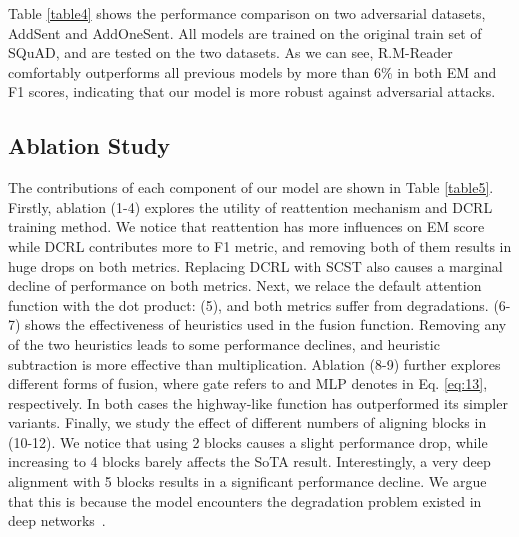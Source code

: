 \documentclass{article}
\begin{document}
Table \ref{table4} shows the performance comparison on two adversarial datasets, AddSent and AddOneSent. All models are trained on the original train set of SQuAD, and are tested on the two datasets. As we can see, R.M-Reader comfortably outperforms all previous models by more than 6\% in both EM and F1 scores, indicating that our model is more robust against adversarial attacks.


\subsection{Ablation Study}
The contributions of each component of our model are shown in Table \ref{table5}. 
Firstly, ablation (1-4) explores the utility of reattention mechanism and DCRL training method.
We notice that reattention has more influences on EM score while DCRL contributes more to F1 metric, and removing both of them results in huge drops on both metrics. 
Replacing DCRL with SCST also causes a marginal decline of performance on both metrics.
Next, we relace the default attention function with the dot product:  (5), and both metrics suffer from degradations.
(6-7) shows the effectiveness of heuristics used in the fusion function. Removing any of the two heuristics leads to some performance declines, and heuristic subtraction is more effective than multiplication.
Ablation (8-9) further explores different forms of fusion, where gate refers to  and MLP denotes  in Eq. \ref{eq:13}, respectively.
In both cases the highway-like function has outperformed its simpler variants.
Finally, we study the effect of different numbers of aligning blocks in (10-12). We notice that using 2 blocks causes a slight performance drop, while increasing to 4 blocks barely affects the SoTA result. Interestingly, a very deep alignment with 5 blocks results in a significant performance decline. We argue that this is because the model encounters the degradation problem existed in deep networks~\cite{He16}.
\end{document}
